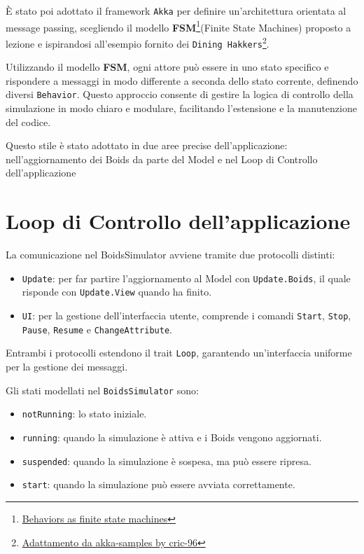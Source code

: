 \documentclass[a4paper,12pt]{report}
\begin{document}
    È stato poi adottato il framework \texttt{Akka} per definire un'architettura orientata al message passing, scegliendo il modello \textbf{FSM}\footnote{\href{https://doc.akka.io/libraries/akka-core/current/typed/fsm.html}{Behaviors as finite state machines}}(Finite State Machines) proposto a lezione e ispirandosi all'esempio fornito dei \texttt{Dining Hakkers}\footnote{\href{https://github.com/cric96/pcd-lab-akka-actors/blob/63e4f3273ef1550c1c744d1f7332b7ce935223ab/src/main/scala/it/unibo/pcd/akka/basics/e07fsm/DiningHakkers.scala}{Adattamento da akka-samples by cric-96}}.
    
    Utilizzando il modello \textbf{FSM}, ogni attore può essere in uno stato specifico e rispondere a messaggi in modo differente a seconda dello stato corrente, definendo diversi  \texttt{Behavior}. Questo approccio consente di gestire la logica di controllo della simulazione in modo chiaro e modulare, facilitando l'estensione e la manutenzione del codice.

    Questo stile è stato adottato in due aree precise dell'applicazione: nell'aggiornamento dei Boids da parte del Model e nel Loop di Controllo dell'applicazione
    
    \section{Loop di Controllo dell'applicazione}
        La comunicazione nel BoidsSimulator avviene tramite due protocolli distinti:
        \begin{itemize}
            \item \texttt{Update}: per far partire l'aggiornamento al Model con \texttt{Update.Boids}, il quale risponde con \texttt{Update.View} quando ha finito. 
            \item \texttt{UI}: per la gestione dell'interfaccia utente, comprende i comandi \texttt{Start}, \texttt{Stop}, \texttt{Pause}, \texttt{Resume} e \texttt{ChangeAttribute}.
        \end{itemize}

        Entrambi i protocolli estendono il trait \texttt{Loop}, garantendo un'interfaccia uniforme per la gestione dei messaggi.

        Gli stati modellati nel \texttt{BoidsSimulator} sono:
        \begin{itemize}
            \item \texttt{notRunning}: lo stato iniziale.
            \item \texttt{running}: quando la simulazione è attiva e i Boids vengono aggiornati.
            \item \texttt{suspended}: quando la simulazione è sospesa, ma può essere ripresa.
            \item \texttt{start}: quando la simulazione può essere avviata correttamente.
        \end{itemize}
\end{document}
